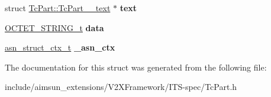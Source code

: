 \begin{DoxyCompactItemize}
\item 
struct \hyperlink{structTcPart_1_1TcPart____text}{Tc\+Part\+::\+Tc\+Part\+\_\+\+\_\+text} $\ast$ {\bfseries text}\hypertarget{structTcPart_acbb2b16897ecffdd1ef066e788b41a68}{}\label{structTcPart_acbb2b16897ecffdd1ef066e788b41a68}

\item 
\hyperlink{structOCTET__STRING}{O\+C\+T\+E\+T\+\_\+\+S\+T\+R\+I\+N\+G\+\_\+t} {\bfseries data}\hypertarget{structTcPart_a52bb11585c19044cd2b6434719c328e7}{}\label{structTcPart_a52bb11585c19044cd2b6434719c328e7}

\item 
\hyperlink{structasn__struct__ctx__s}{asn\+\_\+struct\+\_\+ctx\+\_\+t} {\bfseries \+\_\+asn\+\_\+ctx}\hypertarget{structTcPart_a0bfbba398889685ceeb7297ef9ec58c8}{}\label{structTcPart_a0bfbba398889685ceeb7297ef9ec58c8}

\end{DoxyCompactItemize}


The documentation for this struct was generated from the following file\+:\begin{DoxyCompactItemize}
\item 
include/aimsun\+\_\+extensions/\+V2\+X\+Framework/\+I\+T\+S-\/spec/Tc\+Part.\+h\end{DoxyCompactItemize}
